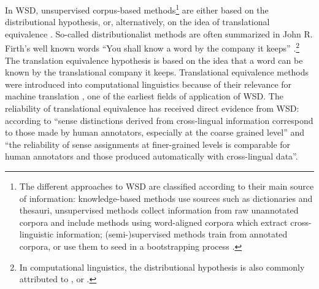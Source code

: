 In WSD, unsupervised corpus-based methods\footnote{The different approaches to WSD are classified according to their main source of information: knowledge-based methods use sources such as dictionaries and thesauri, unsupervised methods collect information from raw unannotated corpora and include methods using word-aligned corpora which extract cross-linguistic information; (semi-)supervised methods train from annotated corpora, or use them to seed in a bootstrapping process \citep[12]{agirre_word_2007}.} are either based on the distributional hypothesis, or, alternatively, on the idea of translational equivalence \citep{agirre_word_2007}. So-called distributionalist methods are often summarized in John R. Firth’s well known words “You shall know a word by the company it keeps” \citep[11]{firth_synopsis_1957}.\footnote{In computational linguistics, the distributional hypothesis is also commonly attributed to \citet{anscombe_philosophical_1953}, \citet{harris_distributional_1954}  or \citet{weaver_translation_1955} \citep[142--143]{turney_frequency_2010}.} The translation equivalence hypothesis is based on the idea that a word can be known by the translational company it keeps. Translational equivalence methods were introduced into computational linguistics because of their relevance for machine translation \citep[134]{agirre_unsupervised_2007}, one of the earliest fields of application of WSD. The reliability of translational equivalence has received direct evidence from WSD: according to \citet[1]{ide_automatic_2001} “sense distinctions derived from cross-lingual information correspond to those made by human annotators, especially at the coarse grained level” and “the reliability of sense assignments at finer-grained levels is comparable for human annotators and those produced automatically with cross-lingual data”.

